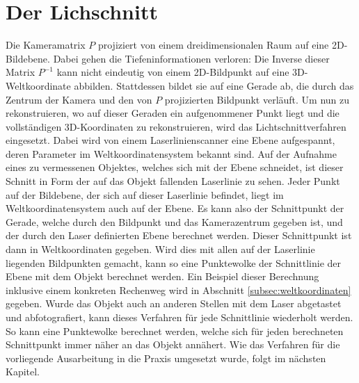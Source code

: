 \section{Der Lichschnitt}
Die Kameramatrix \(P\) projiziert von einem dreidimensionalen Raum auf eine 2D-Bildebene. Dabei gehen die Tiefeninformationen verloren: Die Inverse dieser Matrix \(P^{-1}\) kann nicht eindeutig von einem 2D-Bildpunkt auf eine 3D-Weltkoordinate abbilden. Stattdessen bildet sie auf eine Gerade ab, die durch das Zentrum der Kamera und den von \(P\) projizierten Bildpunkt verläuft. Um nun zu rekonstruieren, wo auf dieser Geraden ein aufgenommener Punkt liegt und die vollständigen 3D-Koordinaten zu rekonstruieren, wird das Lichtschnittverfahren eingesetzt. Dabei wird von einem Laserlinienscanner eine Ebene aufgespannt, deren Parameter im Weltkoordinatensystem bekannt sind. Auf der Aufnahme eines zu vermessenen Objektes, welches sich mit der Ebene schneidet, ist dieser Schnitt in Form der auf das Objekt fallenden Laserlinie zu sehen. Jeder Punkt auf der Bildebene, der sich auf dieser Laserlinie befindet, liegt im Weltkoordinatensystem auch auf der Ebene. Es kann also der Schnittpunkt der Gerade, welche durch den Bildpunkt und das Kamerazentrum gegeben ist, und der durch den Laser definierten Ebene berechnet werden. Dieser Schnittpunkt ist dann in Weltkoordinaten gegeben. Wird dies mit allen auf der Laserlinie liegenden Bildpunkten gemacht, kann so eine Punktewolke der Schnittlinie der Ebene mit dem Objekt berechnet werden. Ein Beispiel dieser Berechnung inklusive einem konkreten Rechenweg wird in Abschnitt \ref{subsec:weltkoordinaten} gegeben.\newline
Wurde das Objekt auch an anderen Stellen mit dem Laser abgetastet und abfotografiert, kann dieses Verfahren für jede Schnittlinie wiederholt werden. So kann eine Punktewolke berechnet werden, welche sich für jeden berechneten Schnittpunkt immer näher an das Objekt annähert. Wie das Verfahren für die vorliegende Ausarbeitung in die Praxis umgesetzt wurde, folgt im nächsten Kapitel.